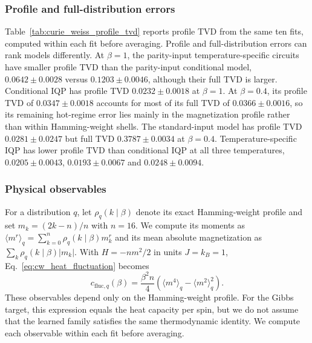 \documentclass[pra,aps,10pt,twocolumn,floatfix,superscriptaddress, notitlepage,longbibliography]{revtex4-2}
\begin{document}


\subsubsection{Profile and full-distribution errors}



Table~\ref{tab:curie_weiss_profile_tvd} reports profile TVD from the same ten fits, computed within each fit before averaging. Profile and full-distribution errors can rank models differently. At $\beta=1$, the parity-input temperature-specific circuits have smaller profile TVD than the parity-input conditional model, $0.0642\pm0.0028$ versus $0.1203\pm0.0046$, although their full TVD is larger. Conditional IQP has profile TVD $0.0232\pm0.0018$ at $\beta=1$. At $\beta=0.4$, its profile TVD of $0.0347\pm0.0018$ accounts for most of its full TVD of $0.0366\pm0.0016$, so its remaining hot-regime error lies mainly in the magnetization profile rather than within Hamming-weight shells. The standard-input model has profile TVD $0.0281\pm0.0247$ but full TVD $0.3787\pm0.0034$ at $\beta=0.4$. Temperature-specific IQP has lower profile TVD than conditional IQP at all three temperatures, $0.0205\pm0.0043$, $0.0193\pm0.0067$ and $0.0248\pm0.0094$.

\subsubsection{Physical observables}
\label{sec:cw_physical_observables}

For a distribution $q$, let $\rho_q(k\mid\beta)$ denote its exact Hamming-weight profile and set $m_k=(2k-n)/n$ with $n=16$. We compute its moments as $\langle m^r\rangle_q=\sum_{k=0}^{n}\rho_q(k\mid\beta)m_k^r$ and its mean absolute magnetization as $\sum_k\rho_q(k\mid\beta)|m_k|$. With $H=-nm^2/2$ in units $J=k_B=1$, Eq.~\eqref{eq:cw_heat_fluctuation} becomes
\begin{equation}
    c_{\mathrm{fluc},q}(\beta)=\frac{\beta^2n}{4}
    \left(\langle m^4\rangle_q-\langle m^2\rangle_q^2\right).
\end{equation}
These observables depend only on the Hamming-weight profile. For the Gibbs target, this expression equals the heat capacity per spin, but we do not assume that the learned family satisfies the same thermodynamic identity. We compute each observable within each fit before averaging.
\end{document}
